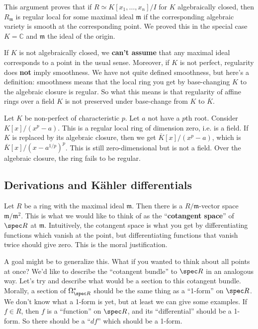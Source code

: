 \begin{remark}[Warning] This argument proves that if $R \simeq K[x_1, \dots,
x_n]/I$ for $K$ algebraically closed, then $R_{\mathfrak{m}}$ is regular local for some maximal ideal
$\mathfrak{m}$ if the corresponding algebraic variety is smooth at the
corresponding point. We proved this in the special case $K  = \mathbb{C}$ and
$\mathfrak{m}$ the ideal of the origin.

If $K$ is not algebraically closed, we \textbf{can't assume} that any maximal
ideal corresponds to a point in the usual sense. Moreover, if $K$ is not
perfect, regularity does \textbf{not} imply smoothness. We have not quite
defined smoothness, but here's a definition: smoothness means that the local
ring you get by base-changing $K$ to the algebraic closure is regular. So what
this means is that 
regularity of affine rings over a field $K$ is not preserved under
base-change from $K$ to $\overline{K}$. 
\end{remark} 

\begin{example} Let $K$ be non-perfect of characteristic $p$. Let $a$ not have
a $p$th root.
Consider $K[x]/(x^p -a)$. This is a regular local ring of dimension zero, i.e.
is a field. If $K$ is replaced by its algebraic closure, then we get
$\overline{K}[x]/(x^p - a)$, which is $\overline{K}[x]/(x- a^{1/p})^p$. This is
still zero-dimensional but is not a field. Over the algebraic closure, the ring
fails to be regular.
\end{example} 

\subsection{Derivations and K\"ahler differentials} Let $R$ be a ring with the maximal ideal
$\mathfrak{m}$. Then there is a $R/\mathfrak{m}$-vector space
$\mathfrak{m}/\mathfrak{m}^2$. This is what we would like to think of as the
``\textbf{cotangent space}'' of $\spec R$ at $\mathfrak{m}$. Intuitively, the
cotangent space is what you get by differentiating functions which vanish at
the point, but
differentiating functions that vanish twice should give zero. This is the moral
justification.

A goal might be to generalize this. What if you wanted to think about all
points at once? We'd like to describe the ``cotangent bundle'' to $\spec R$ in
an analogous way. Let's try and describe what would be a section to this
cotangent bundle. Morally, a section of $\Omega^*_{\spec R}$ should be the same
thing as a ``1-form'' on $\spec R$. We don't know what a 1-form is yet, but at
least we can give some examples. If $f \in R$, then $f$ is a ``function'' on
$\spec R$, and its ``differential'' should be a 1-form. So there should be a
``$df$'' which should be a 1-form. 

